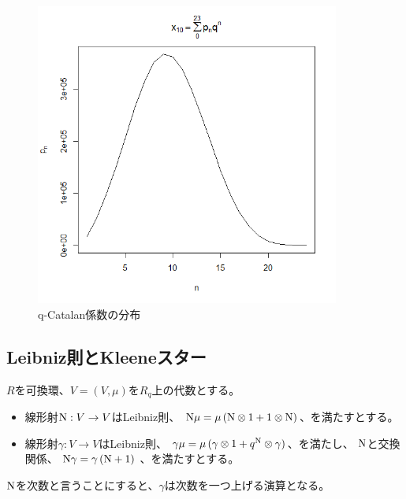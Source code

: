 {	\begin{figure}[htbp] %
		\begin{center}
			\includegraphics[width=100mm]{fig/x-10.png}
		\end{center}
		\caption{q-Catalan係数の分布}\label{fig:q-Catalan係数の分布}
	\end{figure} %
\subsection{Leibniz則とKleeneスター}\label{s2:Leibniz則とKleeneスター} %
	$R$を可換環、$V=(V,\mu)$を$R_q$上の代数とする。
	\begin{itemize}\setlength{\itemsep}{-1mm} %
		\item 線形射${\mathinner{\operatorname{N}}}:V\to V$はLeibniz則、
		${\mathinner{\operatorname{N}}}\mu = \mu\mathinner{({{\mathinner{\operatorname{N}}}\otimes1 + 1\otimes{\mathinner{\operatorname{N}}}})}$、を満たすとする。
		\item 線形射$\gamma:V\to V$はLeibniz則、
		$\gamma\mu = \mu\mathinner{({\gamma\otimes1 + q^{\mathinner{\operatorname{N}}}\otimes\gamma})}$、を満たし、
		${\mathinner{\operatorname{N}}}$と交換関係、
		${\mathinner{\operatorname{N}}}\gamma = \gamma\mathinner{({{\mathinner{\operatorname{N}}}+ 1})}$
		、を満たすとする。
	\end{itemize} %
	${\mathinner{\operatorname{N}}}$を次数と言うことにすると、$\gamma$は次数を一つ上げる演算となる。

}
